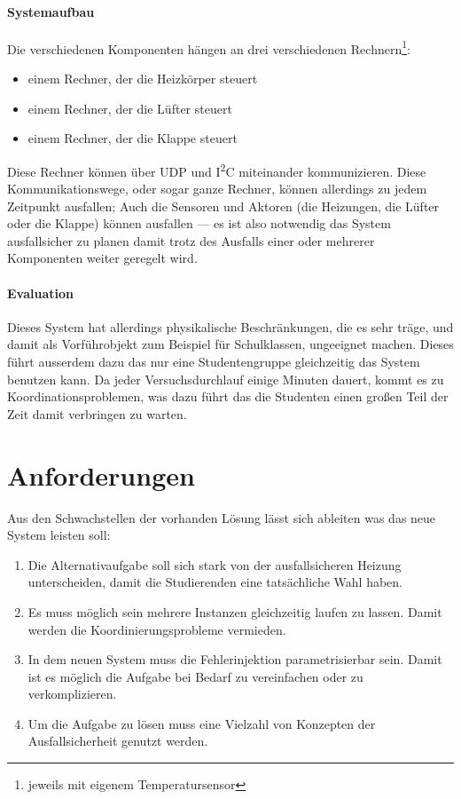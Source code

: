 \paragraph{Systemaufbau} Die verschiedenen Komponenten h{\"{a}}ngen an drei verschiedenen Rechnern\footnote{jeweils mit eigenem Temperatursensor}:
\begin{itemize}
\item einem Rechner, der die Heizk{\"{o}}rper steuert
\item einem Rechner, der die L{\"{u}}fter steuert
\item einem Rechner, der die Klappe steuert
\end{itemize}

Diese Rechner k{\"{o}}nnen {\"{u}}ber UDP und I\textsuperscript{2}C miteinander kommunizieren. Diese Kommunikationswege, oder sogar ganze Rechner, k{\"{o}}nnen
allerdings zu jedem Zeitpunkt ausfallen; Auch die Sensoren und Aktoren (die Heizungen, die L{\"{u}}fter oder die Klappe) k{\"{o}}nnen ausfallen --- es ist also notwendig das
System ausfallsicher zu planen damit trotz des Ausfalls einer oder mehrerer Komponenten weiter geregelt wird.

\paragraph{Evaluation} Dieses System hat allerdings physikalische Beschr{\"{a}}nkungen, die es sehr tr{\"{a}}ge, und damit als Vorf{\"{u}}hrobjekt zum Beispiel f{\"{u}}r Schulklassen,
ungeeignet machen. Dieses f{\"{u}}hrt ausserdem dazu das nur eine Studentengruppe gleichzeitig das System benutzen kann. Da jeder Versuchsdurchlauf einige Minuten dauert, kommt es zu
Koordinationsproblemen, was dazu f{\"{u}}hrt das die Studenten einen gro{\ss}en Teil der Zeit damit verbringen zu warten.

\clearpage
\section{Anforderungen}
Aus den Schwachstellen der vorhanden L{\"{o}}sung l{\"{a}}sst sich ableiten was das neue System leisten soll:
\begin{enumerate}
	\item Die Alternativaufgabe soll sich stark von der ausfallsicheren Heizung unterscheiden, damit die Studierenden eine tats{\"{a}}chliche Wahl haben.
	\item Es muss m{\"{o}}glich sein mehrere Instanzen gleichzeitig laufen zu lassen. Damit werden die Koordinierungsprobleme vermieden.
	\item In dem neuen System muss die Fehlerinjektion parametrisierbar sein. Damit ist es m{\"{o}}glich die Aufgabe bei Bedarf zu vereinfachen oder
		zu verkomplizieren.
	\item Um die Aufgabe zu l{\"{o}}sen muss eine Vielzahl von Konzepten der Ausfallsicherheit genutzt werden.
\end{enumerate}

